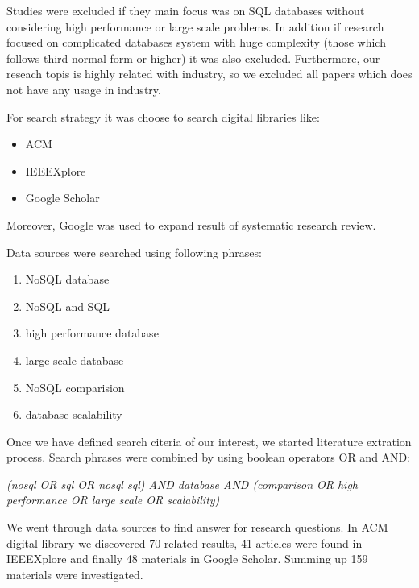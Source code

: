 \documentclass[times, 10pt,twocolumn]{article}
\begin{document}
Studies were excluded if they main focus was on SQL databases without considering high performance or large scale problems. In addition if research focused on complicated databases system
with huge complexity (those which follows third normal form or higher) it was also excluded. Furthermore, our reseach topis is highly related with industry, so we excluded all papers 
which does not have any usage in industry.


For search strategy it was choose to search digital libraries like:
\begin{itemize}
	\item ACM
	\item IEEEXplore
	\item Google Scholar
\end{itemize}

Moreover, Google was used to expand result of systematic research review.

Data sources were searched using following phrases:
\begin{enumerate}
    \item NoSQL database 
	\item NoSQL and SQL
	\item high performance database
	\item large scale database
	\item NoSQL comparision
	\item database scalability
\end{enumerate}



Once we have defined search citeria of our interest, we started literature extration process.
Search phrases were combined by using boolean operators OR and AND:

\emph{(nosql OR sql OR nosql sql) AND database AND (comparison OR high performance OR large scale OR scalability)}
  
We went through data sources to find answer for research questions.
In ACM digital library we discovered 70 related results, 41 articles were found in IEEEXplore and finally 48 materials in Google Scholar.
Summing up 159 materials were investigated. 
\end{document}
